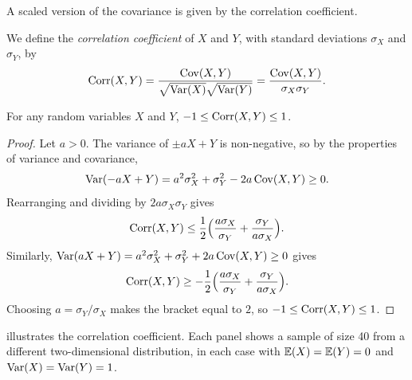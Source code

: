 A scaled version of the covariance is given by the correlation coefficient.

\begin{definition}\label{def:correlation}
We define the \emph{correlation coefficient} of $X$ and $Y$, with standard deviations $\sigma_X$ and $\sigma_Y$, by
\[
  \operatorname{Corr}(X, Y) = \frac{\operatorname{Cov}(X, Y)}{\sqrt{\operatorname{Var}(X)}\sqrt{\operatorname{Var}(Y)}} = \frac{\operatorname{Cov}(X, Y)}{\sigma_X \sigma_Y}.
\]
\end{definition}

\begin{theorem}\label{thm:correlation-bounds}
For any random variables $X$ and $Y$, $-1 \le \operatorname{Corr}(X, Y) \le 1$.
\end{theorem}

\begin{proof}
Let $a > 0$. The variance of $\pm aX + Y$ is non-negative, so by the properties of variance and covariance,
\[
  \operatorname{Var}(-aX + Y) = a^2\sigma_X^2 + \sigma_Y^2 - 2a\operatorname{Cov}(X, Y) \ge 0.
\]
Rearranging and dividing by $2a\sigma_X\sigma_Y$ gives
\[
  \operatorname{Corr}(X, Y) \le \frac12\Bigl(\frac{a\sigma_X}{\sigma_Y} + \frac{\sigma_Y}{a\sigma_X}\Bigr).
\]
Similarly, $\operatorname{Var}(aX + Y) = a^2\sigma_X^2 + \sigma_Y^2 + 2a\operatorname{Cov}(X, Y) \ge 0$ gives
\[
  \operatorname{Corr}(X, Y) \ge -\frac12\Bigl(\frac{a\sigma_X}{\sigma_Y} + \frac{\sigma_Y}{a\sigma_X}\Bigr).
\]
Choosing $a = \sigma_Y/\sigma_X$ makes the bracket equal to $2$, so $-1 \le \operatorname{Corr}(X, Y) \le 1$.
\end{proof}

 illustrates the correlation coefficient. Each panel shows a sample of size 40 from a different two-dimensional distribution, in each case with $\operatorname{\mathbb{E}}(X) = \operatorname{\mathbb{E}}(Y) = 0$ and $\operatorname{Var}(X) = \operatorname{Var}(Y) = 1$.


